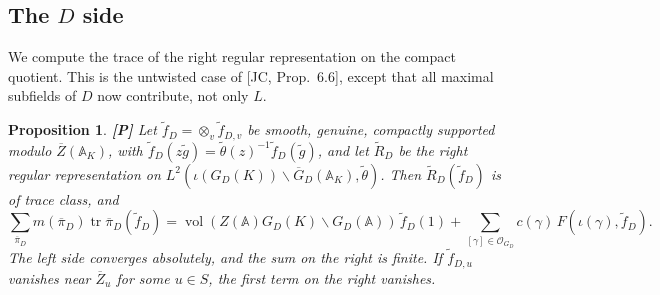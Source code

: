 \documentclass[12pt]{article}
\newcommand{\ov}[1]{\overline{#1}}
\newcommand{\A}{\mathbb{A}}
\newcommand{\tr}{\operatorname{tr}}
\newcommand{\vol}{\operatorname{vol}}
\newcommand{\Zb}{\ov{Z}}
\newcommand{\GDb}{\ov{G}_D}
\newcommand{\pib}{\ov{\pi}}
\newcommand{\Pv}{\textbf{[P]}}
\theoremstyle{plain}
\newtheorem{proposition}[theorem]{Proposition}
\theoremstyle{definition}
\begin{document}
\subsection{The $D$ side}\label{subsec:TFD}
We compute the trace of the right regular representation on the compact quotient. This is the untwisted case of [JC, Prop.~6.6], except that all maximal subfields of $D$ now contribute, not only $L$.

\begin{proposition}\label{prop:geomD}\Pv
Let $\tilde f_D=\otimes_v\tilde f_{D,v}$ be smooth, genuine, compactly supported modulo $\Zb(\A_K)$, with $\tilde f_D(z\tilde g)=\tilde\theta(z)^{-1}\tilde f_D(\tilde g)$, and let $\tilde R_D$ be the right regular representation on $L^2(\iota(G_D(K))\backslash\GDb(\A_K),\tilde\theta)$. Then $\tilde R_D(\tilde f_D)$ is of trace class, and
\[ \sum_{\pib_D}m(\pib_D)\tr\pib_D(\tilde f_D)=\vol(Z(\A)G_D(K)\backslash G_D(\A))\,\tilde f_D(1)+\sum_{[\gamma]\in\mathcal O_{G_D}}c(\gamma)\,F(\iota(\gamma),\tilde f_D). \]
The left side converges absolutely, and the sum on the right is finite. If $\tilde f_{D,u}$ vanishes near $\Zb_u$ for some $u\in S$, the first term on the right vanishes.
\end{proposition}
\end{document}
